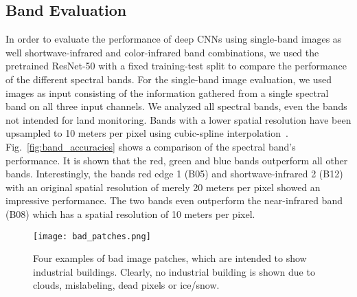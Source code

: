 \documentclass[journal]{IEEEtran}
\begin{document}



\subsection{Band Evaluation}


In order to evaluate the performance of deep CNNs using single-band images as well shortwave-infrared and color-infrared band combinations, we used the pretrained ResNet-50 with a fixed training-test split to compare the performance of the different spectral bands. For the single-band image evaluation, we used images as input consisting of the information gathered from a single spectral band on all three input channels. We analyzed all spectral bands, even the bands not intended for land monitoring. Bands with a lower spatial resolution have been upsampled to 10 meters per pixel using cubic-spline interpolation~\cite{de1978practical}. Fig.~\ref{fig:band_accuracies} shows a comparison of the spectral band's performance. It is shown that the red, green and blue bands outperform all other bands. Interestingly, the bands red edge 1 (B05) and shortwave-infrared 2 (B12) with an original spatial resolution of merely 20 meters per pixel showed an impressive performance. The two bands even outperform the near-infrared band (B08) which has a spatial resolution of 10 meters per pixel. 


\begin{figure}[t]
	\centering
	\texttt{[image: bad\_patches.png]}
	\caption{Four examples of bad image patches, which are intended to show industrial buildings. Clearly, no industrial building is shown due to clouds, mislabeling, dead pixels or ice/snow.}
	\label{fig:bad_patches}
\end{figure}
\end{document}
